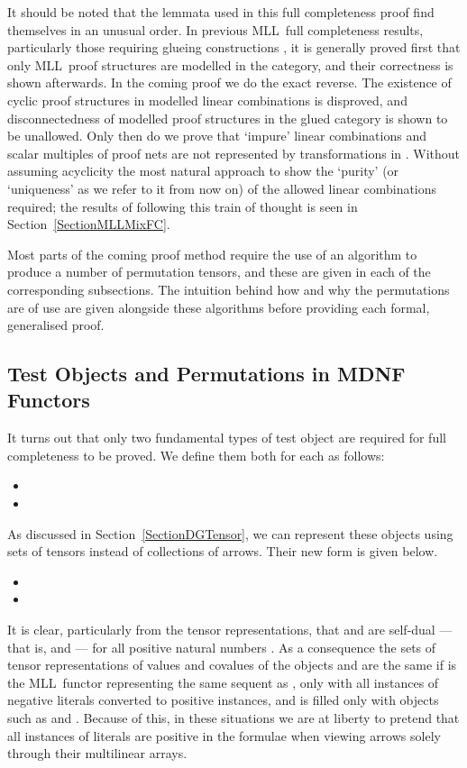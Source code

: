 \documentclass{LMCS}
\theoremstyle{plain}\newtheorem*{cLm}{Claim}
\newcommand{\mll}{MLL} \newcommand{\mall}{MALL}
\newcommand{\p}{} \newcommand{\N}{\mathbb{N}}
\newcommand{\hughh}[1]{#1}
\begin{document}
\p\noindent  It should be noted that the lemmata used in this full completeness proof find themselves in an unusual order. In previous \mll~full completeness results, particularly those requiring glueing constructions \cite{Loa94b,Tan97,Hag00}, it is generally proved first that only \mll~proof structures are modelled in the category, and their correctness is shown afterwards. In the coming proof we do the exact reverse. The existence of cyclic proof structures in modelled linear combinations is disproved, and disconnectedness of modelled proof structures in the glued category is shown to be unallowed. Only then do we prove that `impure' linear combinations and scalar multiples of proof nets are not represented by transformations in . Without assuming acyclicity the most natural approach to show the `purity' (or `uniqueness' as we refer to it from now on) of the allowed linear combinations required; the results of following this train of thought is seen in Section~\ref{SectionMLLMixFC}.

\p Most parts of the coming proof method require the use of an algorithm to produce a number of permutation tensors, and these are given in each of the corresponding subsections. The intuition behind how and why the permutations are of use are given alongside these algorithms before providing each formal, generalised proof.

\subsection{Test Objects and Permutations in MDNF Functors} \label{SectionMDNFObjects}

It turns out that only two fundamental types of test object are required for full completeness to be proved. We define them both for each  as follows:
\begin{itemize}
\item 
\item 
\end{itemize}

\hughh{As discussed in Section~\ref{SectionDGTensor}, we can represent these objects using sets of tensors instead of collections of arrows. Their new form is given below.}
\begin{itemize}
\item 
\item 
\end{itemize}

It is clear, particularly from the tensor representations, that  and  are self-dual --- that is,  and  --- for all positive natural numbers . As a consequence the sets of tensor representations of values and covalues of the objects  and  are the same if  is the \mll~functor representing the same sequent as , only with all instances of negative literals converted to positive instances, and  is filled only with objects such as  and . Because of this, in these situations we are at liberty to pretend that all instances of literals are positive in the formulae when viewing arrows solely through their multilinear arrays.
\end{document}
